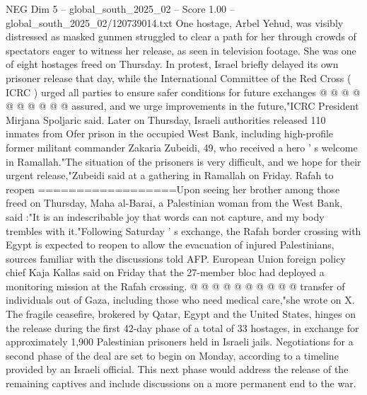 \begin{textsample}{NEG Dim 5 – global\_south\_2025\_02 – Score 1.00 – global\_south\_2025\_02/120739014.txt}
One hostage, Arbel Yehud, was visibly distressed as masked gunmen struggled to clear a path for her through crowds of spectators eager to witness her release, as seen in television footage.
She was one of eight hostages freed on Thursday.
In protest, Israel briefly delayed its own prisoner release that day, while the International Committee of the Red Cross ( ICRC ) urged all parties to ensure safer conditions for future exchanges @ @ @ @ @ @ @ @ @ @ assured, and we urge improvements in the future,"ICRC President Mirjana Spoljaric said.
Later on Thursday, Israeli authorities released 110 inmates from Ofer prison in the occupied West Bank, including high-profile former militant commander Zakaria Zubeidi, 49, who received a hero ' s welcome in Ramallah."The situation of the prisoners is very difficult, and we hope for their urgent release,"Zubeidi said at a gathering in Ramallah on Friday.
Rafah to reopen ==================Upon seeing her brother among those freed on Thursday, Maha al-Barai, a Palestinian woman from the West Bank, said :"It is an indescribable joy that words can not capture, and my body trembles with it."Following Saturday ' s exchange, the Rafah border crossing with Egypt is expected to reopen to allow the evacuation of injured Palestinians, sources familiar with the discussions told AFP.
European Union foreign policy chief Kaja Kallas said on Friday that the 27-member bloc had deployed a monitoring mission at the Rafah crossing. @ @ @ @ @ @ @ @ @ @ transfer of individuals out of Gaza, including those who need medical care,"she wrote on X.
The fragile ceasefire, brokered by Qatar, Egypt and the United States, hinges on the release during the first 42-day phase of a total of 33 hostages, in exchange for approximately 1,900 Palestinian prisoners held in Israeli jails.
Negotiations for a second phase of the deal are set to begin on Monday, according to a timeline provided by an Israeli official.
This next phase would address the release of the remaining captives and include discussions on a more permanent end to the war.

\end{textsample}
